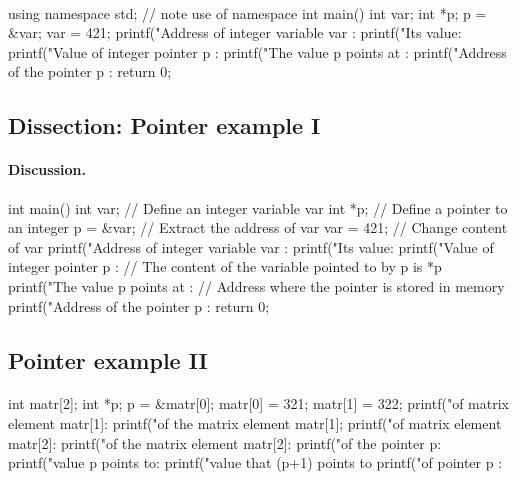 \documentclass[%
twoside,                 %
final,                   %
10pt]{article}
\newenvironment{paragraphadmon}[1][]{\paragraph{#1}}{}
\begin{document}
\begin{paragraphadmon}[]
\bcppcod
using namespace std; // note use of namespace
int main()
{
  int var;
  int *p;
  p = &var;
  var  = 421;
  printf("Address of integer variable var : %
  printf("Its value: %
  printf("Value of integer pointer p : %
  printf("The value p points at :  %
  printf("Address of the pointer p : %
  return 0;
}
\ecppcod
\end{paragraphadmon}



\subsection{Dissection: Pointer example I}


\begin{paragraphadmon}[Discussion.]

\bcppcod
int main()
{
  int var;     // Define an integer variable var
  int *p;      // Define a pointer to an integer
  p = &var;    // Extract the address of var
  var = 421;   // Change content of var
  printf("Address of integer variable var : %
  printf("Its value: %
  printf("Value of integer pointer p : %
  // The content of the variable pointed to by p is *p
  printf("The value p points at :  %
  // Address where the pointer is stored in memory
  printf("Address of the pointer p : %
  return 0;
}
\ecppcod
\end{paragraphadmon}



\subsection{Pointer example II}


\begin{paragraphadmon}[]
\bcppcod
int matr[2];
int *p;
p = &matr[0];
matr[0] = 321;
matr[1] = 322;
printf("\nAddress of matrix element matr[1]: %
printf("\nValue of the  matrix element  matr[1]; %
printf("\nAddress of matrix element matr[2]: %
printf("\nValue of the matrix element  matr[2]: %
printf("\nValue of the pointer p: %
printf("\nThe value p points to: %
printf("\nThe value that (p+1) points to  %
printf("\nAddress of pointer p : %
\ecppcod
\end{paragraphadmon}
\end{document}
